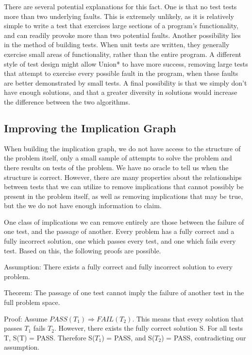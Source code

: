 \documentclass[11pt,twoside]{article}
\begin{document}
There are several potential explanations for this fact. One is that no test tests more than two underlying faults. This is extremely unlikely, as it is relatively simple to write a test that exercises large sections of a program's functionality, and can readily provoke more than two potential faults. Another possibility lies in the method of building tests. When unit tests are written, they generally exercise small areas of functionality, rather than the entire program. A different style of test design might allow Union* to have more success, removing large tests that attempt to exercise every possible fault in the program, when these faults are better demonstrated by small tests. A final possibility is that we simply don't have enough solutions, and that a greater diversity in solutions would increase the difference between the two algorithms.

\subsection{Improving the Implication Graph}



When building the implication graph, we do not have access to the structure of the problem itself, only a small sample of attempts to solve the problem and there results on tests of the problem. We have no oracle to tell us when the structure is correct. However, there are many properties about the relationships between tests that we can utilize to remove implications that cannot possibly be present in the problem itself, as well as removing implications that may be true, but the we do not have enough information  to claim.

One class of implications we can remove entirely are those between the failure of one test, and the passage of another. Every problem has a fully correct and a fully incorrect solution, one which passes every test, and one which fails every test. Based on this, the following proofs are possible.


Assumption: There exists a fully correct and fully incorrect solution to every problem.

Theorem: The passage of one test cannot imply the failure of another test in the full problem space.

Proof: Assume $PASS(T_1) \Rightarrow FAIL(T_2)$. This means that every solution that passes $T_1$ fails $T_2$. However, there exists the fully correct solution S. For all tests T, S(T) = PASS. Therefore S($T_1$) = PASS, and S($T_2$) = PASS, contradicting our assumption.
\end{document}
